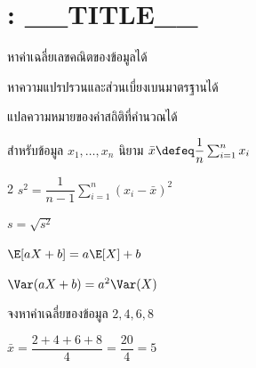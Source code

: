 \section{\txtreview: __TITLE__}
\label{sec:__SLUG__}
\newpointgroup[__TITLE__]   %

\studentline
\scoreline

\topichead{\txtgoals}
\begin{checklist}
  \item หาค่าเฉลี่ยเลขคณิตของข้อมูลได้
  \item หาความแปรปรวนและส่วนเบี่ยงเบนมาตรฐานได้
  \item แปลความหมายของค่าสถิติที่คำนวณได้
\end{checklist}

\topichead{\txtsummary}

\begin{definition}
  \label{def:__SLUG__-mean}
  สำหรับข้อมูล $x_1, \dots, x_n$ นิยาม $\bar{x} \defeq \dfrac{1}{n}\sum_{i=1}^{n} x_i$
\end{definition}

\begin{formulabox}{\txtkeypoints}
  \begin{multicols}{2}
    \setlength{\parskip}{0.8em}
    $s^2 = \dfrac{1}{n-1}\sum\limits_{i=1}^{n} (x_i - \bar{x})^2$

    $s = \sqrt{s^2}$

    $\E[aX + b] = a\E[X] + b$

    $\Var(aX + b) = a^2 \Var(X)$
  \end{multicols}
\end{formulabox}

\topichead{\txtworked}

\begin{example}
  \label{ex:__SLUG__-1}
  จงหาค่าเฉลี่ยของข้อมูล $2, 4, 6, 8$
\end{example}
\begin{solution}
  $\bar{x} = \dfrac{2 + 4 + 6 + 8}{4} = \dfrac{20}{4} = 5$
\end{solution}

